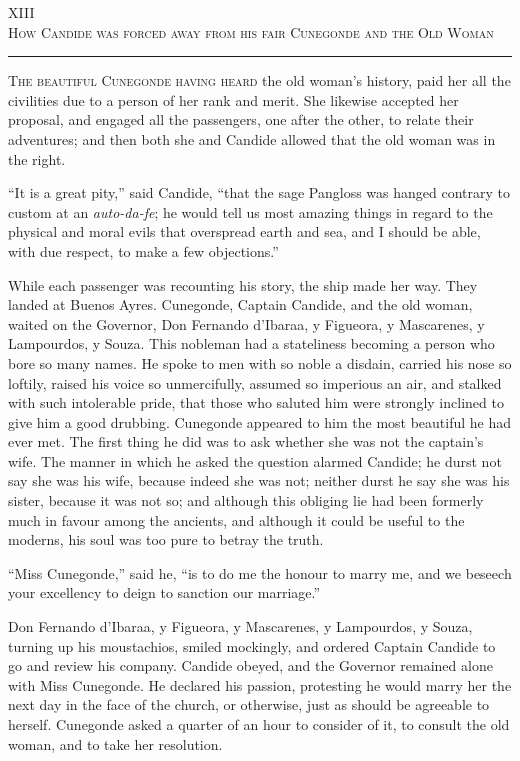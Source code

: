 \begin{center}
XIII\\
\textsc{How Candide was forced away from his fair Cunegonde and the Old Woman}
\end{center}
\vspace{-0.5cm}
\rule{\textwidth}{0.5pt}
\lettrine{T}{he beautiful Cunegonde having heard} the old woman's history, paid her all the civilities due to a person of her rank and merit. She likewise accepted her proposal, and engaged all the passengers, one after the other, to relate their adventures; and then both she and Candide allowed that the old woman was in the right.

``It is a great pity,'' said Candide, ``that the sage Pangloss was hanged contrary to custom at an \textit{auto-da-fe}; he would tell us most amazing things in regard to the physical and moral evils that overspread earth and sea, and I should be able, with due respect, to make a few objections.''

While each passenger was recounting his story, the ship made her way. They landed at Buenos Ayres. Cunegonde, Captain Candide, and the old woman, waited on the Governor, Don Fernando d'Ibaraa, y Figueora, y Mascarenes, y Lampourdos, y Souza. This nobleman had a stateliness becoming a person who bore so many names. He spoke to men with so noble a disdain, carried his nose so loftily, raised his voice so unmercifully, assumed so imperious an air, and stalked with such intolerable pride, that those who saluted him were strongly inclined to give him a good drubbing. Cunegonde appeared to him the most beautiful he had ever met. The first thing he did was to ask whether she was not the captain's wife. The manner in which he asked the question alarmed Candide; he durst not say she was his wife, because indeed she was not; neither durst he say she was his sister, because it was not so; and although this obliging lie had been formerly much in favour among the ancients, and although it could be useful to the moderns, his soul was too pure to betray the truth.

``Miss Cunegonde,'' said he, ``is to do me the honour to marry me, and we beseech your excellency to deign to sanction our marriage.''

Don Fernando d'Ibaraa, y Figueora, y Mascarenes, y Lampourdos, y Souza, turning up his moustachios, smiled mockingly, and ordered Captain Candide to go and review his company. Candide obeyed, and the Governor remained alone with Miss Cunegonde. He declared his passion, protesting he would marry her the next day in the face of the church, or otherwise, just as should be agreeable to herself. Cunegonde asked a quarter of an hour to consider of it, to consult the old woman, and to take her resolution.

